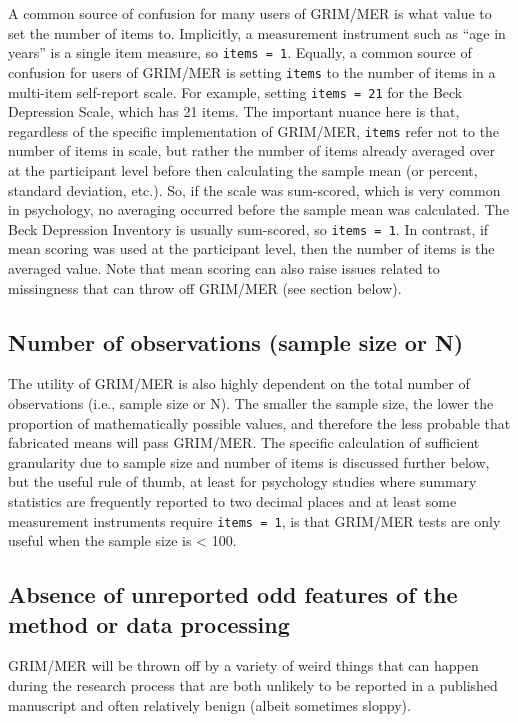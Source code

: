\documentclass[letterpaper, 12pt]{article}
\begin{document}
{A common source of confusion for many users of GRIM/MER is what value to set the number of items to. Implicitly, a measurement instrument such as ``age in years'' is a single item measure, so \texttt{items = 1}. Equally, a common source of confusion for users of GRIM/MER is setting \texttt{items} to the number of items in a multi-item self-report scale. For example, setting \texttt{items = 21} for the Beck Depression Scale, which has 21 items. The important nuance here is that, regardless of the specific implementation of GRIM/MER, \texttt{items} refer not to the number of items in scale, but rather the number of items already averaged over at the participant level before then calculating the sample mean (or percent, standard deviation, etc.). So, if the scale was sum-scored, which is very common in psychology, no averaging occurred before the sample mean was calculated. The Beck Depression Inventory is usually sum-scored, so \texttt{items = 1}. In contrast, if mean scoring was used at the participant level, then the number of items is the averaged value. Note that mean scoring can also raise issues related to missingness that can throw off GRIM/MER (see section below). 

\subsection*{Number of observations (sample size or N)}

The utility of GRIM/MER is also highly dependent on the total number of observations (i.e., sample size or N). The smaller the sample size, the lower the proportion of mathematically possible values, and therefore the less probable that fabricated means will pass GRIM/MER. The specific calculation of sufficient granularity due to sample size and number of items is discussed further below, but the useful rule of thumb, at least for psychology studies where summary statistics are frequently reported to two decimal places and at least some measurement instruments require \texttt{items = 1}, is that GRIM/MER tests are only useful when the sample size is < 100. 

\subsection*{Absence of unreported odd features of the method or data processing}

GRIM/MER will be thrown off by a variety of weird things that can happen during the research process that are both unlikely to be reported in a published manuscript and often relatively benign (albeit sometimes sloppy).

}
\end{document}
